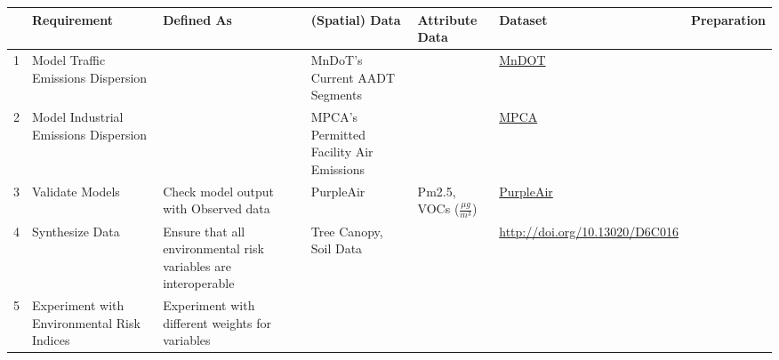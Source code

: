 \documentclass[article,12pt]{article}
\numberwithin{equation}{section}
\begin{document}
{
	\scriptsize
	\begin{tabular}{|l|p{.2\linewidth}|p{.2\linewidth}|p{.2\linewidth}|p{.1\linewidth}|p{.1\linewidth}|p{.1\linewidth}|}
	\hline	& \textbf{Requirement} & \textbf{Defined As} & \textbf{(Spatial) Data} & \textbf{Attribute Data} & \textbf{Dataset} & \textbf{Preparation} \\ \hline
		1 & Model Traffic Emissions Dispersion         &                                                                & MnDoT’s Current AADT Segments           &                                                   & \href{https://gisdata.mn.gov/dataset/trans-aadt-traffic-segments}{MnDOT}                                                                                                                 &             \\ \hline
		2 & Model Industrial Emissions Dispersion      &                                                                & MPCA’s Permitted Facility Air Emissions &                                                   & \href{https://www.pca.state.mn.us/air/permitted-facility-air-emissions-data}{MPCA}                                                                                                      &             \\ \hline
		3 & Validate Models                            & Check model output with Observed data                          & PurpleAir                               & Pm2.5, VOCs ($\frac{\mu g}{m^3}$) & \href{https://api.purpleair.com/}{PurpleAir}                                                                                                                                                 &             \\ \hline
		4 & Synthesize Data                            & Ensure that all environmental risk variables are interoperable & Tree Canopy, Soil Data                  &                                                   & \url{http://doi.org/10.13020/D6C016}                                                                                                                                            &             \\ \hline
		5 & Experiment with Environmental Risk Indices & Experiment with different weights for variables                &                                         &                                                   &                                                                                                                                                                                                         &             \\ \hline

\end{tabular}}
\end{document}
